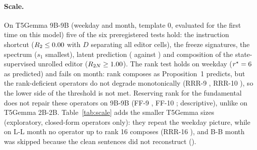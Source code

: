 \paragraph{Scale.}
On T5Gemma 9B-9B (weekday and month, template 0, evaluated for the first time on this model) five of the six preregistered tests hold:
the instruction shortcut ($R_{2} \le 0.00{}$ with $D$ separating all \CLeighteenDsepCells{} editor cells), the freeze
signatures, the spectrum ($s_1$ smallest), latent prediction (\CLeighteenAgree{} against \CLeighteenNaive{}) and composition of the
state-supervised unrolled editor ($R_{2N} \ge 1.00{}$). The rank test holds on weekday ($r^\star =
6{}$ as predicted) and fails on month: rank \CLeighteenRstarMonth{} composes as Proposition~1 predicts, but the
rank-deficient operators do not degrade monotonically (RRR-9 \CLeighteenRnineMonth{}, RRR-10 \CLeighteenRtenMonth{}), so the lower side of
the threshold is not met. Reserving rank for the fundamental does not repair these operators on 9B-9B (FF-9 \CLeighteenFFnineMonth{},
FF-10 \CLeighteenFFtenMonth{}; descriptive), unlike on T5Gemma 2B-2B. Table~\ref{tab:scale} adds the smaller T5Gemma sizes
(exploratory, closed-form operators only): they repeat the weekday picture, while on L-L month no operator up to rank 16 composes
(RRR-16 \CLeighteenLLmonth{}), and B-B month was skipped because the clean sentences did not reconstruct (\CLeighteenBBmonthRecon{}).
\begin{table}[t]\centering\scriptsize

\caption{Scale (v8; generated by \texttt{paper/scripts/scale\_table.py}). recon.: decoded clean encodings, train and dev. $r^\star$: smallest
rank whose one-way $\Rk{2N}$ is at least 95\%. Surgeries on RRR-16. agree: per-world agreement of the slot readout with the decoded chains,
pooled over the size's cells. 9B-9B is the preregistered unit; B-B and L-L are exploratory.}\label{tab:scale}
\end{table}


